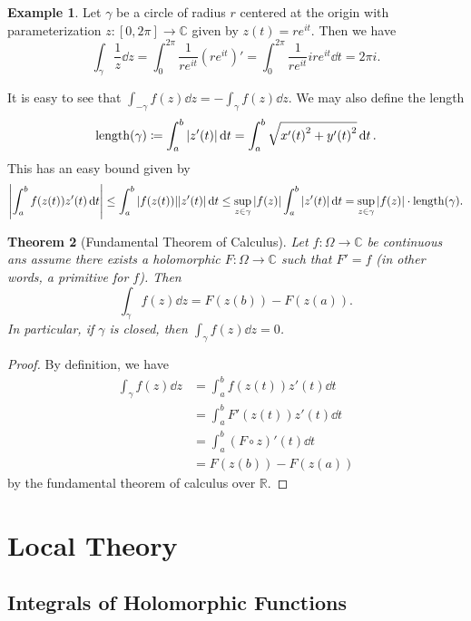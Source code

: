 \documentclass[leqno, openany]{memoir}
\newtheorem{thm}{Theorem}[section]
\theoremstyle{definition}
\newtheorem{exm}[thm]{Example}
\theoremstyle{remark}
\theoremstyle{plain}
\theoremstyle{definition}
\theoremstyle{remark}
\newcommand{\R}{\mathbb{R}}
\newcommand{\C}{\mathbb{C}}
\DeclareMathOperator{\len}{length}
\begin{document}
\begin{exm} Let $\gamma$ be a circle of radius $r$ centered at the origin with
    parameterization $z \colon [0,2\pi] \to \C$ given by $z(t) = re^{it}$. Then
    we have \[ \int_{\gamma} \frac{1}{z} \dd{z} = \int_0^{2 \pi}
    \frac{1}{re^{it}} {(re^{it})}' = \int_0^{2 \pi} \frac{1}{re^{it}} ire^{it}
\dd{t} = 2 \pi i. \] \end{exm}

It is easy to see that $\int_{- \gamma} f(z) \dd{z} = - \int_{\gamma} f(z)
\dd{z}$. We may also define the length \[ \len(\gamma) \coloneqq \int_a^b
\abs{z'(t)} \dd{t} = \int_a^b \sqrt{ {x'(t)}^2 + {y'(t)}^2 } \dd{t}. \] This
has an easy bound given by \[ \abs{ \int_a^b f(z(t)) z'(t) \dd{t} } \leq
\int_a^b \abs{f(z(t))} \abs{z'(t)} \dd{t} \leq \sup_{z \in \gamma} \abs{f(z)}
\int_a^b \abs{z'(t)} \dd{t} = \sup_{z \in \gamma} \abs{f(z)} \cdot
\len(\gamma). \]

\begin{thm}[Fundamental Theorem of Calculus] Let $f \colon \Omega \to \C$ be
    continuous ans assume there exists a holomorphic $F \colon \Omega \to \C$
    such that $F' = f$ (in other words, a \textit{primitive} for $f$). Then \[
    \int_{\gamma} f(z) \dd{z} = F(z(b)) - F(z(a)). \] In particular, if
$\gamma$ is closed, then $\int_{\gamma} f(z) \dd{z} = 0$.  \end{thm}

\begin{proof} By definition, we have \begin{align*} \int_{\gamma} f(z) \dd{z}
&= \int_a^b f(z(t)) z'(t) \dd{t} \\ &= \int_a^b F'(z(t)) z'(t) \dd{t} \\ &=
\int_a^b {(F \circ z)}'(t) \dd{t} \\ &= F(z(b)) - F(z(a)) \end{align*} by the
fundamental theorem of calculus over $\R$.  \end{proof}

\chapter{Local Theory}%

\section{Integrals of Holomorphic Functions}%
\label{sec:integrals_of_holomorphic_functions}
\end{document}
